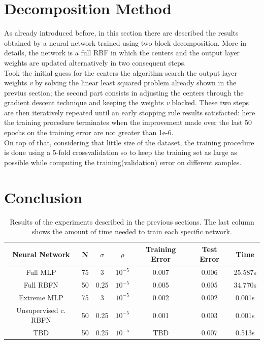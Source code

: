\documentclass[a4paper]{article}
\numberwithin{equation}{section} %
\numberwithin{figure}{section} %
\numberwithin{table}{section} %
\theoremstyle{definition}
\begin{document}
\section{Decomposition Method}
As already introduced before, in this section there are described the results obtained by a neural network trained using two block decomposition. More in details, the network is a full RBF in which the centers and the output layer weights are updated alternatively in two consequent steps.\\
Took the initial guess for the centers the algorithm search the output layer weights \textit{v} by solving the linear least squared problem already shown in the previus section; the second part consists in adjusting the centers through the gradient descent technique and keeping the weights \textit{v} blocked. These two steps are then iteratively repeated until an early stopping rule results satisfacted: here the training procedure terminates when the improvement made over the last 50 epochs on the training error are not greater than 1e-6.\\
On top of that, considering that little size of the dataset, the training procedure is done using a 5-fold crossvalidation so to keep the training set as large as possible while computing the training(validation) error on different samples.


\section{Conclusion}

\begin{table}
	\footnotesize
	\centering
	\begin{tabular}{*{7}{c}}
		Neural Network & N & $\sigma$ & $\rho$ & Training Error & Test Error & Time \\
		\hline
		Full MLP & 75 & 3 & $10^{-5}$ & 0.007 & 0.006 & 25.587s \\
		Full RBFN & 50 & 0.25 & $10^{-5}$ & 0.005 & 0.005 & 34.770s \\
		Extreme MLP & 75 & 3 & $10^{-5}$ & 0.002 & 0.002 & 0.001s \\
		Unsupervised c. RBFN & 50 & 0.25 & $10^{-5}$ & 0.001 & 0.003 & 0.001s \\
		TBD & 50 & 0.25 & $10^{-5}$ & TBD & 0.007 & 0.513s \\
	\end{tabular}
	\caption{Results of the experiments described in the previous sections.
		The last column shows the amount of time needed to train each
		specific network.}
	\label{tab:experiments}
\end{table}
\end{document}
